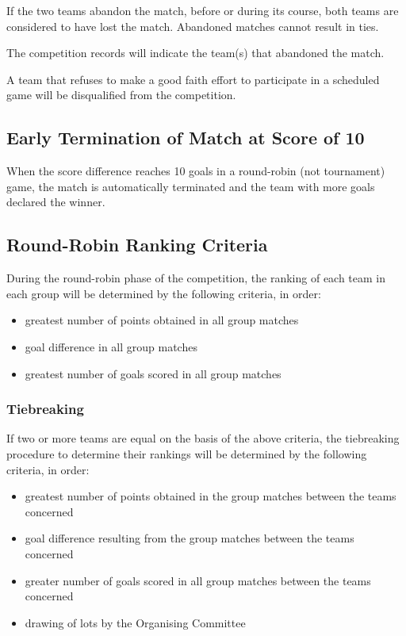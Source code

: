 If the two teams abandon the match, before or during its course, both teams are considered to have lost the match.
Abandoned matches cannot result in ties.

The competition records will indicate the team(s) that abandoned the match.

A team that refuses to make a good faith effort to participate in a
scheduled game will be disqualified from the competition.

\subsection{Early Termination of Match at Score of 10}

When the score difference reaches 10 goals in a round-robin (not tournament) game, the match is automatically terminated and the team with more goals declared the winner.

\subsection{Round-Robin Ranking Criteria}

During the round-robin phase of the competition, the ranking of each team in each group will be determined by the following criteria, in order:
\begin{itemize}
\item greatest number of points obtained in all group matches
\item goal difference in all group matches
\item greatest number of goals scored in all group matches
\end{itemize}

\subsubsection{Tiebreaking}
If two or more teams are equal on the basis of the above criteria, the tiebreaking procedure to determine their rankings will be determined by the following criteria, in order:
\begin{itemize}
\item greatest number of points obtained in the group matches between the teams concerned
\item goal difference resulting from the group matches between the teams concerned
\item greater number of goals scored in all group matches between the teams concerned
\item drawing of lots by the Organising Committee
\end{itemize}

